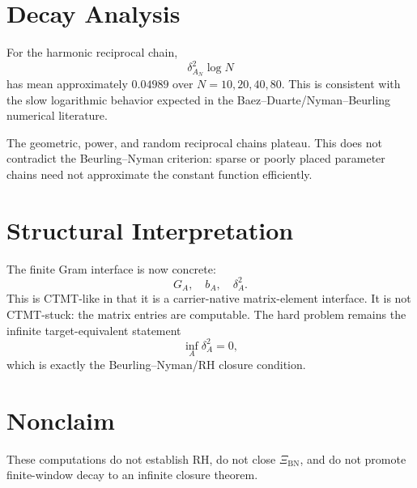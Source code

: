 \documentclass[11pt]{article}
\newcommand{\BN}{\mathrm{BN}}
\begin{document}
\section*{Decay Analysis}

For the harmonic reciprocal chain,
\[
\delta_{A_N}^2\log N
\]
has mean approximately \(0.04989\) over \(N=10,20,40,80\).  This is consistent with the slow logarithmic behavior expected in the Baez--Duarte/Nyman--Beurling numerical literature.

The geometric, power, and random reciprocal chains plateau.  This does not contradict the Beurling--Nyman criterion: sparse or poorly placed parameter chains need not approximate the constant function efficiently.

\section*{Structural Interpretation}

The finite Gram interface is now concrete:
\[
G_A,\quad b_A,\quad \delta_A^2.
\]
This is CTMT-like in that it is a carrier-native matrix-element interface.  It is not CTMT-stuck: the matrix entries are computable.  The hard problem remains the infinite target-equivalent statement
\[
\inf_A \delta_A^2=0,
\]
which is exactly the Beurling--Nyman/RH closure condition.

\section*{Nonclaim}

These computations do not establish RH, do not close \(\Xi_{\BN}\), and do not promote finite-window decay to an infinite closure theorem.
\end{document}
